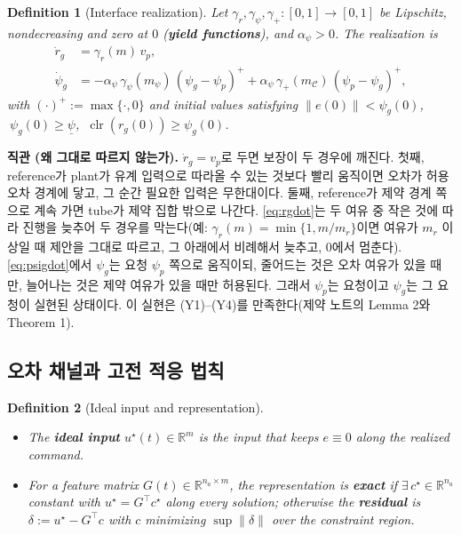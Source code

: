 \documentclass[11pt]{article}\usepackage[margin=1in]{geometry}\usepackage{amsmath,amssymb,amsthm,mathtools}\usepackage{graphicx}\graphicspath{{figures/}{../figures/}{figs/}{./}}\usepackage{enumitem}\usepackage{hyperref}\usepackage{cleveref}\usepackage{tikz}\usetikzlibrary{arrows.meta,positioning,calc,shapes.geometric}\usepackage{float}\usepackage{rotating}\usepackage[most]{tcolorbox}\usepackage{kotex}\usepackage{booktabs}\emergencystretch=1.6em\tolerance=2000 \crefname{assumption}{Assumption}{Assumptions}\Crefname{assumption}{Assumption}{Assumptions}\crefname{definition}{Definition}{Definitions}\Crefname{definition}{Definition}{Definitions}\crefname{proposition}{Proposition}{Propositions}\Crefname{proposition}{Proposition}{Propositions}\crefname{fact}{Fact}{Facts}\Crefname{fact}{Fact}{Facts} \newtheorem{assumption}{Assumption}\newtheorem{definition}{Definition}\newtheorem{lemma}{Lemma}\newtheorem{proposition}{Proposition}\newtheorem{theorem}{Theorem}\newtheorem{corollary}{Corollary}\newtheorem{fact}{Fact}\theoremstyle{remark}\newtheorem{remark}{Remark} \newcommand{\R}{\mathbb{R}}\newcommand{\xb}{\bar x}\newcommand{\Ab}{\bar A}\newcommand{\By}{\bar B_y}\newcommand{\U}{\mathcal U}\newcommand{\Z}{\mathcal Z}
\newcommand{\Cset}{\mathcal C}\newcommand{\Pcl}{\mathcal P}\newcommand{\Kset}{\mathcal K}
\begin{document}
\begin{definition}[Interface realization]
\label{def:interfacereal}
Let $\gamma_r,\gamma_\psi,\gamma_+:[0,1]\to[0,1]$ be Lipschitz, nondecreasing and zero at $0$ (\textbf{\emph{yield functions}}), and $\alpha_\psi>0$. The realization is
\begin{align}
\dot r_g&=\gamma_r(m)\,v_p, \label{eq:rgdot}\\
\dot\psi_g&=-\alpha_\psi\,\gamma_\psi(m_\psi)\,(\psi_g-\psi_p)^+ +\alpha_\psi\,\gamma_+(m_{\Cset})\,(\psi_p-\psi_g)^+, \label{eq:psigdot}
\end{align}
with $(\cdot)^+:=\max\{\cdot,0\}$ and initial values satisfying $\|e(0)\|<\psi_g(0)$, $\ \psi_g(0)\ge\underline\psi$, $\ \operatorname{clr}(r_g(0))\ge\psi_g(0)$.
\end{definition}

\textbf{직관 (왜 그대로 따르지 않는가).} $\dot r_g=v_p$로 두면 보장이 두 경우에 깨진다. 첫째, reference가 plant가 유계 입력으로 따라올 수 있는 것보다 빨리 움직이면 오차가 허용 오차 경계에 닿고, 그 순간 필요한 입력은 무한대이다. 둘째, reference가 제약 경계 쪽으로 계속 가면 tube가 제약 집합 밖으로 나간다. \eqref{eq:rgdot}는 두 여유 중 작은 것에 따라 진행을 늦추어 두 경우를 막는다(예: $\gamma_r(m)=\min\{1,m/m_r\}$이면 여유가 $m_r$ 이상일 때 제안을 그대로 따르고, 그 아래에서 비례해서 늦추고, 0에서 멈춘다). \eqref{eq:psigdot}에서 $\psi_g$는 요청 $\psi_p$ 쪽으로 움직이되, 줄어드는 것은 오차 여유가 있을 때만, 늘어나는 것은 제약 여유가 있을 때만 허용된다. 그래서 $\psi_p$는 요청이고 $\psi_g$는 그 요청이 실현된 상태이다. 이 실현은 (Y1)--(Y4)를 만족한다(제약 노트의 Lemma 2와 Theorem 1).

\subsection{오차 채널과 고전 적응 법칙}

\begin{definition}[Ideal input and representation]
\label{def:repr}
\begin{itemize}
\item The \textbf{\emph{ideal input}} $u^\star(t)\in\R^m$ is the input that keeps $e\equiv0$ along the realized command.
\item For a feature matrix $G(t)\in\R^{n_a\times m}$, the representation is \textbf{\emph{exact}} if $\exists\,c^\star\in\R^{n_a}$ constant with $u^\star=G^\top c^\star$ along every solution; otherwise the \textbf{\emph{residual}} is $\delta:=u^\star-G^\top c$ with $c$ minimizing $\sup\|\delta\|$ over the constraint region.
\end{itemize}
\end{definition}
\end{document}

